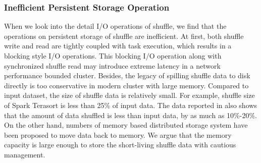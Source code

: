 \subsubsection{Inefficient Persistent Storage Operation}
When we look into the detail I/O operations of shuffle, we find that the operations on persistent storage of shuffle are inefficient. At first, both shuffle write and read are tightly coupled with task execution, which results in a blocking style I/O operations. This blocking I/O operation along with synchronized shuffle read may introduce extreme latency in a network performance bounded cluster.
Besides, the legacy of spilling shuffle data to disk directly is too conservative in modern cluster with large memory. Compared to input dataset, the size of shuffle data is relatively small. For example, shuffle size of Spark Terasort \cite{spark-tera} is less than 25\% of input data. The data reported in \cite{makingsense} also shows that the amount of data shuffled is less than input data, by as much as 10\%-20\%. On the other hand, numbers of memory based distributed storage system have been proposed \cite{memcached, tachyon, ramcloud} to move data back to memory. 
We argue that the memory capacity is large enough to store the short-living shuffle data with cautious management.

